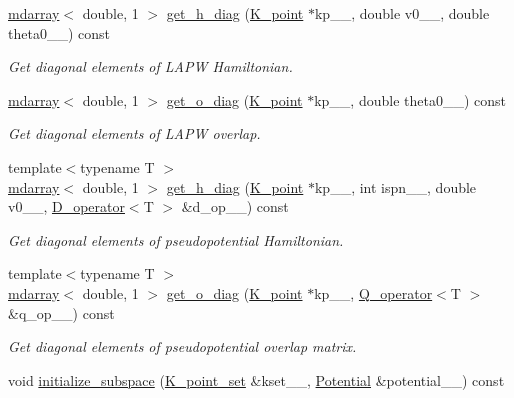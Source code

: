 \begin{DoxyCompactItemize}
\item 
\hyperlink{classsddk_1_1mdarray}{mdarray}$<$ double, 1 $>$ \hyperlink{classsirius_1_1_band_a1ff476fcf47f57f5603e0acfa4011c6f}{get\+\_\+h\+\_\+diag} (\hyperlink{classsirius_1_1_k__point}{K\+\_\+point} $\ast$kp\+\_\+\+\_\+, double v0\+\_\+\+\_\+, double theta0\+\_\+\+\_\+) const 
\begin{DoxyCompactList}\small\item\em Get diagonal elements of L\+A\+P\+W Hamiltonian. \end{DoxyCompactList}\item 
\hyperlink{classsddk_1_1mdarray}{mdarray}$<$ double, 1 $>$ \hyperlink{classsirius_1_1_band_abb9d26ea7d7bcb182b31f0fc36859c32}{get\+\_\+o\+\_\+diag} (\hyperlink{classsirius_1_1_k__point}{K\+\_\+point} $\ast$kp\+\_\+\+\_\+, double theta0\+\_\+\+\_\+) const 
\begin{DoxyCompactList}\small\item\em Get diagonal elements of L\+A\+P\+W overlap. \end{DoxyCompactList}\item 
{\footnotesize template$<$typename T $>$ }\\\hyperlink{classsddk_1_1mdarray}{mdarray}$<$ double, 1 $>$ \hyperlink{classsirius_1_1_band_a64bf53215f72886a4f543aae001166f1}{get\+\_\+h\+\_\+diag} (\hyperlink{classsirius_1_1_k__point}{K\+\_\+point} $\ast$kp\+\_\+\+\_\+, int ispn\+\_\+\+\_\+, double v0\+\_\+\+\_\+, \hyperlink{classsirius_1_1_d__operator}{D\+\_\+operator}$<$T $>$ \&d\+\_\+op\+\_\+\+\_\+) const 
\begin{DoxyCompactList}\small\item\em Get diagonal elements of pseudopotential Hamiltonian. \end{DoxyCompactList}\item 
{\footnotesize template$<$typename T $>$ }\\\hyperlink{classsddk_1_1mdarray}{mdarray}$<$ double, 1 $>$ \hyperlink{classsirius_1_1_band_a332ce79500aad8f0329ee73067ebe14d}{get\+\_\+o\+\_\+diag} (\hyperlink{classsirius_1_1_k__point}{K\+\_\+point} $\ast$kp\+\_\+\+\_\+, \hyperlink{classsirius_1_1_q__operator}{Q\+\_\+operator}$<$T $>$ \&q\+\_\+op\+\_\+\+\_\+) const 
\begin{DoxyCompactList}\small\item\em Get diagonal elements of pseudopotential overlap matrix. \end{DoxyCompactList}\item 
void \hyperlink{classsirius_1_1_band_abe2e5832a35777c26bc5faba0e22e9eb}{initialize\+\_\+subspace} (\hyperlink{classsirius_1_1_k__point__set}{K\+\_\+point\+\_\+set} \&kset\+\_\+\+\_\+, \hyperlink{classsirius_1_1_potential}{Potential} \&potential\+\_\+\+\_\+) const 

\end{DoxyCompactItemize}
